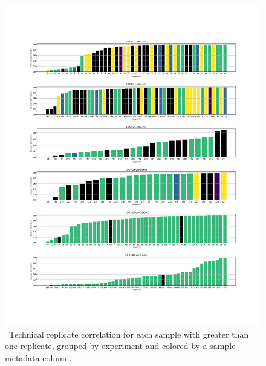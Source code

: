 \documentclass{article}
\begin{document}
\begin{figure}
\centering
\includegraphics[width=1.0\textwidth]{figures/ANON_TECH_REP.pdf}
\caption{ \
Technical replicate correlation for each sample with greater than one replicate, grouped by experiment and colored by a sample metadata column.
}
\label{fig:tech_reps}
\end{figure}
\end{document}
